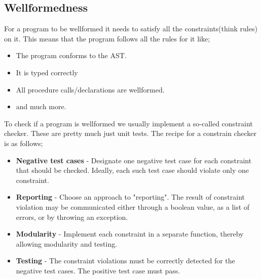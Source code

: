         \subsection{Wellformedness}
            For a program to be \gls{wellformed} it needs to satisfy all the constraints(think rules) on it. This means that the program follows all the rules 
            for it like; 
            \begin{itemize}
                \item The program conforms to the AST.
                \item It is typed correctly
                \item All procedure calls/declarations are wellformed.
                \item and much more.
            \end{itemize}
            To check if a program is wellformed we usually implement a so-called constraint checker. These are pretty much just unit tests.
            The recipe for a constrain checker is as follows;
            \begin{itemize}
                \item \textbf{Negative test cases} - Designate one negative test case for each constraint that should be checked. 
                Ideally, each such test case should violate only one constraint.
                \item \textbf{Reporting} - Choose an approach to "reporting". The result of constraint violation may be communicated either through
                                        a boolean value, as a list of errors, or by throwing an exception.
                \item \textbf{Modularity} - Implement each constraint in a separate function, thereby allowing modularity and testing.
                \item \textbf{Testing} - The constraint violations must be correctly detected for the negative test cases. The positive test case must pass.
            \end{itemize}

    